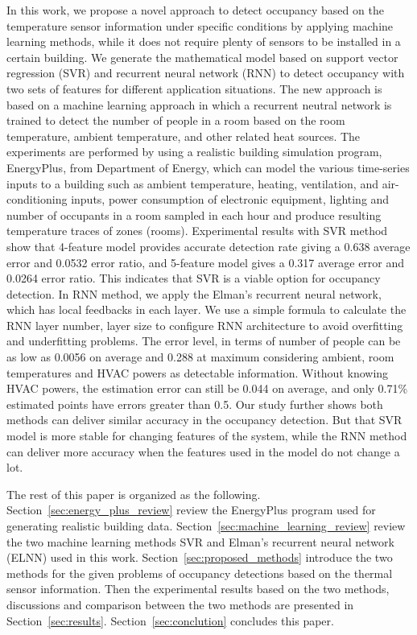 In this work, we propose a novel approach to detect occupancy based on
the temperature sensor information under specific conditions by
applying machine learning methods, while it does not require plenty of
sensors to be installed in a certain building.  We generate the
mathematical model based on support vector regression (SVR) and
recurrent neural network (RNN) to detect occupancy with two sets of
features for different application situations.  The new approach is
based on a machine learning approach in which a recurrent neutral
network is trained to detect the number of people in a room based on
the room temperature, ambient temperature, and other related heat
sources.  The experiments are performed by using a realistic building
simulation program, EnergyPlus, from Department of Energy, which can
model the various time-series inputs to a building such as ambient
temperature, heating, ventilation, and air-conditioning inputs, power
consumption of electronic equipment, lighting and number of occupants
in a room sampled in each hour and produce resulting temperature
traces of zones (rooms).  Experimental results with SVR method show
that 4-feature model provides accurate detection rate giving a 0.638
average error and 0.0532 error ratio, and 5-feature model gives a
0.317 average error and 0.0264 error ratio. This indicates that SVR is
a viable option for occupancy detection.  In RNN method, we apply the
Elman's recurrent neural network, which has local feedbacks in each
layer. We use a simple formula to calculate the RNN layer number,
layer size to configure RNN architecture to avoid overfitting and
underfitting problems. The error level, in terms of number of people
can be as low as 0.0056 on average and 0.288 at maximum considering
ambient, room temperatures and HVAC powers as detectable
information. Without knowing HVAC powers, the estimation error can
still be 0.044 on average, and only 0.71\% estimated points have
errors greater than 0.5. Our study further shows both methods can
deliver similar accuracy in the occupancy detection.  But that SVR
model is more stable for changing features of the system, while the
RNN method can deliver more accuracy when the features used in the
model do not change a lot.


The rest of this paper is organized as the following.
Section~\ref{sec:energy_plus_review} review the EnergyPlus program
used for generating realistic building
data. Section~\ref{sec:machine_learning_review} review the two machine
learning methods SVR and Elman's recurrent neural network (ELNN) used
in this work.  Section~\ref{sec:proposed_methods} introduce the two
methods for the given problems of occupancy detections based on the
thermal sensor information. Then the experimental results based on the
two methods, discussions and comparison between the two methods are
presented in Section~\ref{sec:results}. Section~\ref{sec:conclution}
concludes this paper.

